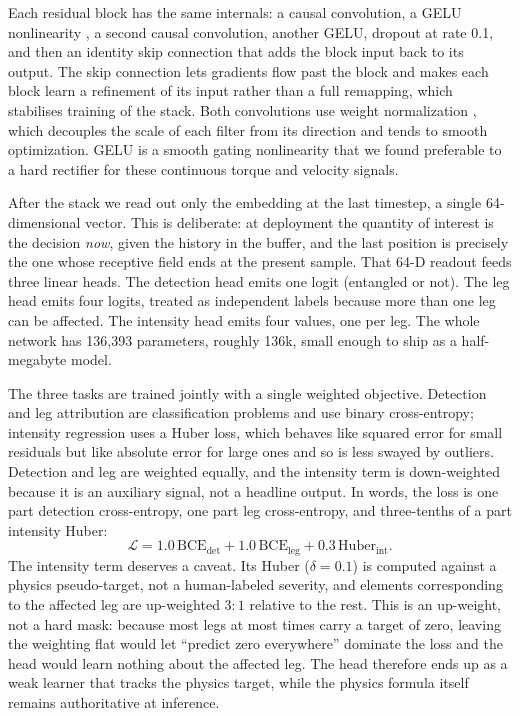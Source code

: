 Each residual block has the same internals: a causal convolution, a GELU nonlinearity \cite{hendrycks2016gelu}, a second causal convolution, another GELU, dropout at rate 0.1, and then an identity skip connection that adds the block input back to its output. The skip connection lets gradients flow past the block and makes each block learn a refinement of its input rather than a full remapping, which stabilises training of the stack. Both convolutions use weight normalization \cite{salimans2016weightnorm}, which decouples the scale of each filter from its direction and tends to smooth optimization. GELU is a smooth gating nonlinearity that we found preferable to a hard rectifier for these continuous torque and velocity signals.

After the stack we read out only the embedding at the last timestep, a single 64-dimensional vector. This is deliberate: at deployment the quantity of interest is the decision \emph{now}, given the history in the buffer, and the last position is precisely the one whose receptive field ends at the present sample. That 64-D readout feeds three linear heads. The detection head emits one logit (entangled or not). The leg head emits four logits, treated as independent labels because more than one leg can be affected. The intensity head emits four values, one per leg. The whole network has 136{,}393 parameters, roughly 136k, small enough to ship as a half-megabyte model.

The three tasks are trained jointly with a single weighted objective. Detection and leg attribution are classification problems and use binary cross-entropy; intensity regression uses a Huber loss, which behaves like squared error for small residuals but like absolute error for large ones and so is less swayed by outliers. Detection and leg are weighted equally, and the intensity term is down-weighted because it is an auxiliary signal, not a headline output. In words, the loss is one part detection cross-entropy, one part leg cross-entropy, and three-tenths of a part intensity Huber:
\begin{equation}
\mathcal{L} = 1.0\,\mathrm{BCE}_{\text{det}} + 1.0\,\mathrm{BCE}_{\text{leg}} + 0.3\,\mathrm{Huber}_{\text{int}} .
\end{equation}
The intensity term deserves a caveat. Its Huber ($\delta=0.1$) is computed against a physics pseudo-target, not a human-labeled severity, and elements corresponding to the affected leg are up-weighted $3{:}1$ relative to the rest. This is an up-weight, not a hard mask: because most legs at most times carry a target of zero, leaving the weighting flat would let ``predict zero everywhere'' dominate the loss and the head would learn nothing about the affected leg. The head therefore ends up as a weak learner that tracks the physics target, while the physics formula itself remains authoritative at inference.

